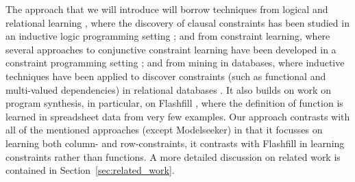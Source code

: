 \documentclass{sig-alternate-05-2015}
\newcommand{\tias}[1]{\textcolor{blue}{{\sc Tias:} #1}\xspace}
\begin{document}
The approach that we will introduce will borrow techniques from logical and relational learning \cite{luc_book}, where
the discovery of clausal constraints has been studied in an inductive logic programming setting \cite{claudien,lallouet}; and from constraint learning,  where several approaches to conjunctive constraint learning have been developed in a constraint programming setting \cite{Quacq,Conacq,modelseeker}; 
and from mining in databases, where inductive techniques have been applied to discover constraints (such as functional and multi-valued dependencies) in relational databases \cite{savnik}.  It also builds on work on program synthesis, in particular, on Flashfill \cite{flashfill}, where the definition of function is learned in spreadsheet data from
very few examples.  Our approach contrasts with all of the mentioned approaches (except Modelseeker) in that it focusses
on learning both column- and row-constraints, it contrasts with Flashfill in learning constraints rather than functions.
A more detailed discussion on related work is contained in Section~\ref{sec:related_work}.


\end{document}
